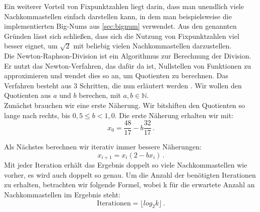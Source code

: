 \documentclass[course=erap]{aspdoc}
\begin{document}
Ein weiterer Vorteil von Fixpunktzahlen liegt darin, dass man unendlich viele Nachkommastellen einfach darstellen kann, in dem man beispielsweise die implementierten Big-Nums aus \ref{sec:bignum} verwendet. Aus den
genannten Gründen lässt sich schließen, dass sich die Nutzung von Fixpunktzahlen viel besser eignet, um $\sqrt{2}$ mit beliebig vielen Nachkommastellen darzustellen. \\

Die Newton-Raphson-Division ist ein Algorithmus zur Berechnung der Division. Er nutzt das Newton-Verfahren, das dafür da ist, Nullstellen von Funktionen zu approximieren und wendet dies so an, um Quotienten zu berechnen. 
Das Verfahren besteht aus 3 Schritten, die nun erläutert werden \cite{newton_raphson_division}. Wir wollen den Quotienten aus $a$ und $b$ berechen, mit $a, b \in \mathbb{N}$. \\
Zunächst brauchen wir eine erste Näherung. Wir bitshiften den Quotienten so lange nach rechts, bis $0,5 \leq b < 1,0$. Die erste Näherung erhalten wir mit:
\begin{equation} \label{eq:erste_naeherung}
  x_0 = \frac{48}{17} - b \frac{32}{17} \, .
\end{equation}

Als Nächstes berechnen wir iterativ immer bessere Näherungen:
\begin{equation} \label{eq:iterationen}
  x_{i + 1} = x_i (2 - b x_i) \, .
\end{equation}
Mit jeder Iteration erhält das Ergebnis doppelt so viele Nachkommastellen wie vorher, es wird auch doppelt so genau. Um die Anzahl der benötigten Iterationen zu erhalten, betrachten wir folgende Formel, wobei k für die erwartete Anzahl an Nachkommastellen im Ergebnis steht:
\begin{equation} \label{eq:anzahl_iterationen}
  \text{Iterationen} = \lfloor log_2k\rfloor \, .
\end{equation}
\end{document}
